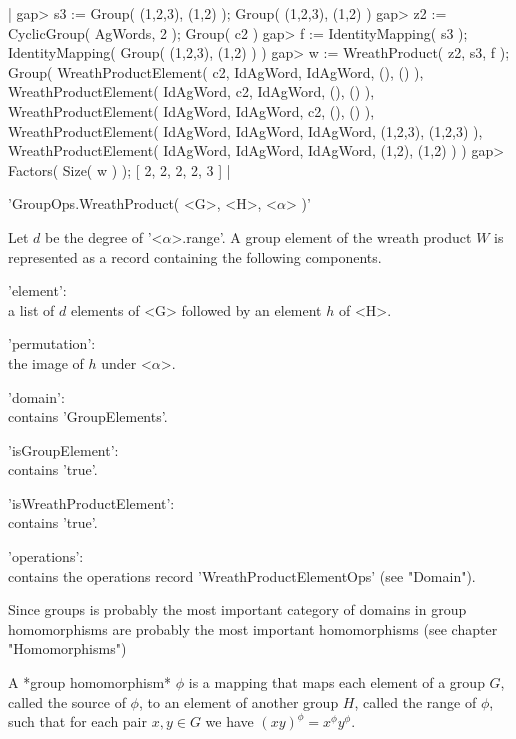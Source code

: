 |    gap> s3 := Group( (1,2,3), (1,2) );
    Group( (1,2,3), (1,2) )
    gap> z2 := CyclicGroup( AgWords, 2 );
    Group( c2 )
    gap> f := IdentityMapping( s3 );
    IdentityMapping( Group( (1,2,3), (1,2) ) )
    gap> w := WreathProduct( z2, s3, f );
    Group( WreathProductElement(
    c2, IdAgWord, IdAgWord, (), () ), WreathProductElement( IdAgWord,
    c2, IdAgWord, (), () ), WreathProductElement( IdAgWord, IdAgWord,
    c2, (), () ), WreathProductElement( IdAgWord, IdAgWord, IdAgWord,
    (1,2,3),
    (1,2,3) ), WreathProductElement( IdAgWord, IdAgWord, IdAgWord, (1,2),
    (1,2) ) )
    gap> Factors( Size( w ) );
    [ 2, 2, 2, 2, 3 ] |


'GroupOps.WreathProduct( <G>, <H>, <$\alpha$> )'

Let  $d$ be the  degree of '<$\alpha$>.range'.    A group element  of the
wreath  product $W$ is represented  as  a record containing the following
components.

'element': \\
        a list of $d$ elements of <G> followed by an element $h$ of <H>.

'permutation': \\
        the image of $h$ under <$\alpha$>.

'domain': \\
        contains 'GroupElements'.

'isGroupElement': \\
        contains 'true'.

'isWreathProductElement': \\
        contains 'true'.

'operations': \\
        contains         the              operations             record
        'WreathProductElementOps' (see "Domain").


%

Since groups is probably the most important category of domains in {\GAP}
group homomorphisms  are  probably the most  important homomorphisms (see
chapter "Homomorphisms")

A *group homomorphism* $\phi$  is a  mapping  that maps each element of a
group $G$,  called  the  source of $\phi$, to an element of another group
$H$, called the range of $\phi$, such that for each pair $x, y \in  G$ we
have $(xy)^\phi = x^\phi y^\phi$.

